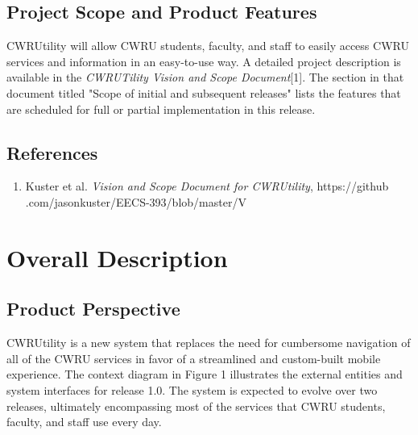 \documentclass[pdftex,12pt,letter]{article}
\begin{document}
\subsection{Project Scope and Product Features}
CWRUtility will allow CWRU students, faculty, and staff to easily access CWRU services and information in an easy-to-use way. A detailed project description is available in the \emph{CWRUTility Vision and Scope Document}[1]. The section in that document titled "Scope of initial and subsequent releases" lists the features that are scheduled for full or partial implementation in this release.

\subsection{References}
\begin{enumerate}[1.]
\item Kuster et al. \emph{Vision and Scope Document for CWRUtility}, https://github\\.com/jasonkuster/EECS-393/blob/master/V%
\end{enumerate}

\section{Overall Description}
\subsection{Product Perspective}
CWRUtility is a new system that replaces the need for cumbersome navigation of all of the CWRU services in favor of a streamlined and custom-built mobile experience. The context diagram in Figure 1 illustrates the external entities and system interfaces for release 1.0. The system is expected to evolve over two releases, ultimately encompassing most of the services that CWRU students, faculty, and staff use every day.
\end{document}
